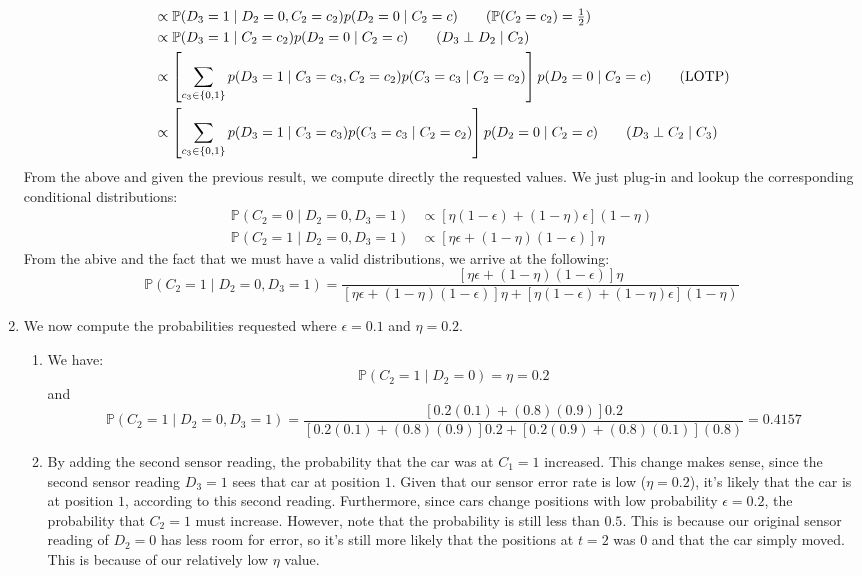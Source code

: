 \documentclass[12pt]{article}
\begin{document}
\begin{enumerate}[label=(\alph*)]
\begin{align*}
    &\propto \mathbb{P}(D_3 = 1 \mid D_2 = 0, C_2 = c_2)p(D_2 = 0 \mid C_2 = c) \tag{$\mathbb{P}(C_2 = c_2) = \frac{1}{2}$} \\
    &\propto \mathbb{P}(D_3 = 1 \mid C_2 = c_2)p(D_2 = 0 \mid C_2 = c) \tag{$D_3 \perp D_2 \mid C_2$} \\
    &\propto \left[\sum_{c_3 \in \{0,1\}} p(D_3 = 1 \mid C_3 = c_3, C_2 = c_2)p(C_3 = c_3 \mid C_2 = c_2)\right]p(D_2 = 0 \mid C_2 = c) \tag{LOTP} \\
    &\propto \left[\sum_{c_3 \in \{0,1\}} p(D_3 = 1 \mid C_3 = c_3)p(C_3 = c_3 \mid C_2 = c_2)\right]p(D_2 = 0 \mid C_2 = c) \tag{$D_3 \perp C_2 \mid C_3$}
    \end{align*}
    From the above and given the previous result, we compute directly the requested values. We just plug-in and lookup the corresponding conditional distributions:
    \begin{align*}
      \mathbb{P}(C_2 = 0 \mid D_2 = 0, D_3 = 1) &\propto [\eta (1-\epsilon) + (1-\eta)\epsilon](1-\eta) \\
      \mathbb{P}(C_2 = 1 \mid D_2 = 0, D_3 = 1) &\propto  [\eta\epsilon + (1-\eta)(1-\epsilon)]\eta
    \end{align*}
    From the abive and the fact that we must have a valid distributions, we arrive at the following:
    $$
      \mathbb{P}(C_2 = 1 \mid D_2 = 0, D_3 = 1) =  \frac{[\eta\epsilon + (1-\eta)(1-\epsilon)]\eta}{[\eta\epsilon + (1-\eta)(1-\epsilon)]\eta + [\eta (1-\epsilon) + (1-\eta)\epsilon](1-\eta)}
    $$
  \item We now compute the probabilities requested where $\epsilon = 0.1$ and $\eta = 0.2$.
  \begin{enumerate}[label=(\roman*)]
    \item We have:
    $$
      \mathbb{P}(C_2 = 1 \mid D_2 = 0) = \eta = 0.2
    $$
    and 
    $$
      \mathbb{P}(C_2 = 1 \mid D_2 = 0, D_3 =1) = \frac{[0.2(0.1) + (0.8)(0.9)]0.2}{[0.2(0.1) + (0.8)(0.9)]0.2 + [0.2 (0.9) + (0.8)(0.1)](0.8)} = 0.4157
    $$
    \item By adding the second sensor reading, the probability that the car was at $C_1 = 1$ increased. This change makes sense, since the second sensor reading $D_3 = 1$ sees that car at position $1$. Given that our sensor error rate is low ($\eta = 0.2$), it's likely that the car is at position $1$, according to this second reading. Furthermore, since cars change positions with low probability $\epsilon = 0.2$, the probability that $C_2 = 1$ must increase. However, note that the probability is still less than $0.5$. This is because our original sensor reading of $D_2 = 0$ has less room for error, so it's still more likely that the positions at $t = 2$ was $0$ and that the car simply moved. This is because of our relatively low $\eta$ value.


\end{enumerate}
\end{enumerate}
\end{document}
